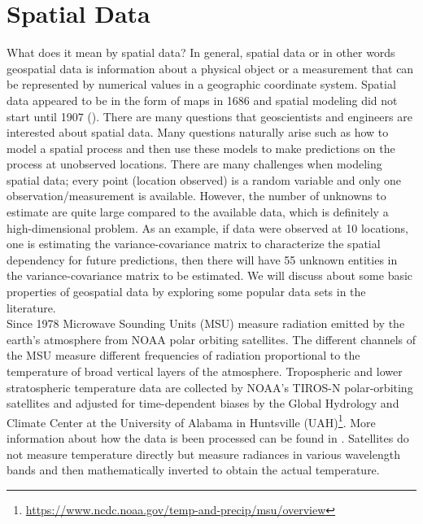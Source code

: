 %
%
%
%


\section{Spatial Data}

What does it mean by spatial data? In general, spatial data or in other words geospatial data is information about a physical object or a measurement that can be represented by numerical values in a geographic coordinate system. Spatial data appeared to be in the form of maps in 1686 and spatial modeling did not start until 1907 (\cite{Cressie1993}). There are many questions that geoscientists and engineers are interested about spatial data. Many questions naturally arise such as how to model a spatial process and then use these models to make predictions on the process at unobserved locations. There are many challenges when modeling spatial data; every point (location observed) is a random variable and only one observation/measurement is available. However, the number of unknowns to estimate are quite large compared to the available data, which is definitely a high-dimensional problem. As an example, if data were observed at 10 locations, one is estimating the variance-covariance matrix to characterize the spatial dependency for future predictions, then there will have 55 unknown entities in the variance-covariance matrix to be estimated. We will discuss about some basic properties of geospatial data by exploring some popular data sets in the literature. \\




Since 1978 Microwave Sounding Units (MSU) measure radiation emitted by the earth's atmosphere from NOAA polar orbiting satellites. The different channels of the MSU measure different frequencies of radiation proportional to the temperature of broad vertical layers of the atmosphere. Tropospheric and lower stratospheric temperature data are collected by NOAA's TIROS-N polar-orbiting satellites and adjusted for time-dependent biases by the Global Hydrology and Climate Center at the University of Alabama in Huntsville (UAH)\footnote{\url{https://www.ncdc.noaa.gov/temp-and-precip/msu/overview}}. More information about how the data is been processed can be found in \cite{ChristySpencerBraswell2000}. Satellites do not measure temperature directly but measure radiances in various wavelength bands and then mathematically inverted to obtain the actual temperature.

